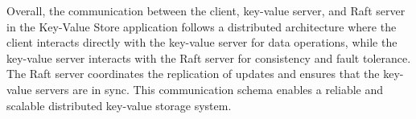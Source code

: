 \documentclass{article}
\begin{document}
Overall, the communication between the client, key-value server, and Raft server in the Key-Value
Store application follows a distributed architecture where the client interacts directly with the
key-value server for data operations, while the key-value server interacts with the Raft server
for consistency and fault tolerance. The Raft server coordinates the replication of updates and
ensures that the key-value servers are in sync. This communication schema enables a reliable and
scalable distributed key-value storage system.


% 
% 
\end{document}
